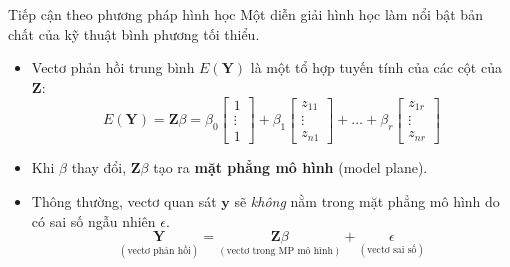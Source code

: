 \begin{frame}{Tiếp cận theo phương pháp hình học}
    Một diễn giải hình học làm nổi bật bản chất của kỹ thuật bình phương tối thiểu.
    \begin{itemize}
        \item Vectơ phản hồi trung bình $E(\mathbf{Y})$ là một tổ hợp tuyến tính của các cột của $\mathbf{Z}$:
        \[
        E(\mathbf{Y}) = \mathbf{Z}\beta = \beta_0 \begin{bmatrix} 1 \\ \vdots \\ 1 \end{bmatrix} + \beta_1 \begin{bmatrix} z_{11} \\ \vdots \\ z_{n1} \end{bmatrix} + \dots + \beta_r \begin{bmatrix} z_{1r} \\ \vdots \\ z_{nr} \end{bmatrix}
        \]
        \item Khi $\beta$ thay đổi, $\mathbf{Z}\beta$ tạo ra \textbf{mặt phẳng mô hình} (model plane).
        \item Thông thường, vectơ quan sát $\mathbf{y}$ sẽ \textit{không} nằm trong mặt phẳng mô hình do có sai số ngẫu nhiên $\epsilon$.
        \[
        \underset{(\text{vectơ phản hồi})}{\mathbf{Y}} = \underset{(\text{vectơ trong MP mô hình})}{\mathbf{Z}\beta} + \underset{(\text{vectơ sai số})}{\epsilon}
        \]
        
    \end{itemize}
\end{frame}

